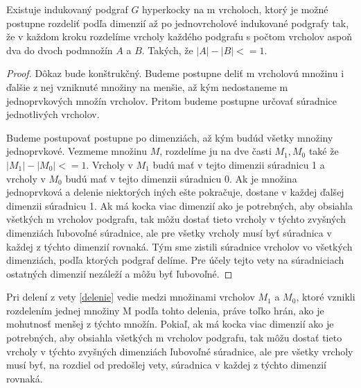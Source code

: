 \begin{veta}
\label{delenie}
Existuje indukovaný podgraf $G$ hyperkocky na m vrcholoch, ktorý je možné 
postupne rozdeliť
podľa dimenzií až po jednovrcholové indukované podgrafy tak, že v každom
kroku rozdelíme vrcholy každého podgrafu s počtom vrcholov aspoň dva do
dvoch podmnožín $A$ a $B$. Takých, že $|A| - |B| <= 1$.
\end{veta}

\begin{proof}
Dôkaz bude konštrukčný. Budeme postupne deliť m vrcholovú množinu i ďalšie z
nej vzniknuté množiny na menšie, až kým nedostaneme m jednoprvkových množín
vrcholov. Pritom budeme postupne určovať súradnice jednotlivých vrcholov.

Budeme postupovať postupne po dimenziách, až kým budúd všetky množiny
jednoprvkové. Vezmeme množinu $M$, rozdelíme ju na dve časti $M_{1}, M_{0}$
také že $|M_{1}| - |M_{0}| <= 1$. Vrcholy v $M_{1}$ budú mať v tejto
dimenzii súradnicu 1 a vrcholy v $M_{0}$ budú mať v tejto dimenzii súradnicu
0. Ak je množina jednoprvková a delenie niektorých iných ešte pokračuje,
dostane v každej ďalšej dimenzii súradnicu 1. Ak má kocka viac dimenzií ako
je potrebných, aby obsiahla všetkých m vrcholov podgrafu, tak môžu dostať
tieto vrcholy v týchto zvyšných dimenziách ľubovoľné súradnice, ale pre
všetky vrcholy musí byť súradnica v každej z týchto dimenzií rovnaká.
Tým sme zistili súradnice vrcholov vo všetkých dimenziách, podľa ktorých
podgraf delíme. Pre účely tejto vety na súradniciach ostatných dimenzií
nezáleží a môžu byť ľubovoľné.
\end{proof}

\begin{veta}
\label{mensia}
Pri delení z vety \ref{delenie} vedie medzi množinami vrcholov $M_{1}$ a $M_{0}$,
ktoré vznikli rozdelením jednej množiny M podľa tohto delenia, práve toľko
hrán, ako je mohutnosť menšej z týchto množín. Pokiaľ, ak má kocka viac 
dimenzií ako
je potrebných, aby obsiahla všetkých m vrcholov podgrafu, tak môžu dostať
tieto vrcholy v týchto zvyšných dimenziách ľubovoľné súradnice, ale pre
všetky vrcholy musí byť, na rozdiel od predošlej vety, súradnica
 v každej z týchto dimenzií rovnaká.
\end{veta}

